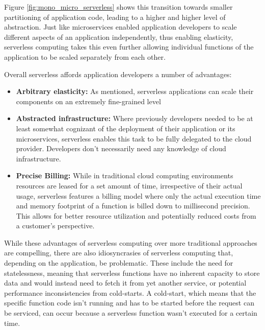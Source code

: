 Figure \ref{fig:mono_micro_serverless} shows this transition towards smaller partitioning of application code, leading to a higher and higher level of abstraction.
Just like microservices enabled application developers to scale different aspects of an application independently, thus enabling elasticity, serverless computing takes this even further allowing individual functions of the application to be scaled separately from each other\cite{jonasCloudProgrammingSimplified2019}.

Overall serverless affords application developers a number of advantages:
\begin{itemize}
    \item \textbf{Arbitrary elasticity:} As mentioned, serverless applications can scale their components on an extremely fine-grained level\cite{khandelwalTaureauDeconstructingServerless2020}
    \item \textbf{Abstracted infrastructure:} Where previously developers needed to be at least somewhat cognizant of the deployment of their application or its microservices, serverless enables this task to be fully delegated to the cloud provider. Developers don't necessarily need any knowledge of cloud infrastructure\cite{jonasCloudProgrammingSimplified2019}.
    \item \textbf{Precise Billing:} While in traditional cloud computing environments resources are leased for a set amount of time, irrespective of their actual usage\cite{khandelwalTaureauDeconstructingServerless2020}, serverless features a billing model where only the actual execution time and memory footprint of a function is billed down to millisecond precision\cite{jonasCloudProgrammingSimplified2019}. This allows for better resource utilization and potentially reduced costs from a customer's perspective\cite{khandelwalTaureauDeconstructingServerless2020}.
\end{itemize}

While these advantages of serverless computing over more traditional approaches are compelling, there are also idiosyncrasies of serverless computing that, depending on the application, be problematic.
These include the need for statelessness, meaning that serverless functions have no inherent capacity to store data and would instead need to fetch it from yet another service\cite{khandelwalTaureauDeconstructingServerless2020}, or potential performance inconsistencies from cold-starts.
A cold-start, which means that the specific function code isn't running and has to be started before the request can be serviced, can occur because a serverless function wasn't executed for a certain time\cite{wangPeekingCurtainsServerless2018}.

